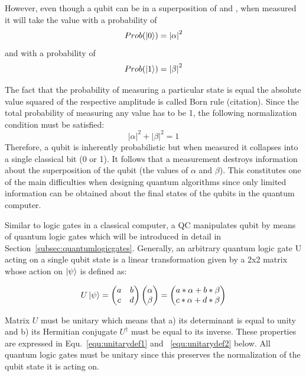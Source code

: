 However, even though a qubit can be in a superposition of \0 and \1, when measured it will take the value \0 with a probability of
\begin{equation}
\label{equ:bornrule0}
Prob(\ket{0}) = {|\alpha|}^{2}
\end{equation}
and \1 with a probability of 
\begin{equation}
\label{equ:bornrule1}
Prob(\ket{1}) = {|\beta|}^{2}
\end{equation}

The fact that the probability of measuring a particular state is equal the absolute value squared of the respective amplitude is called Born rule (citation). Since the total probability of measuring any value has to be 1, the following normalization condition must be satisfied:
\begin{equation}
\label{equ: normalization}
{|\alpha|}^{2} + {|\beta|}^{2} =  1
\end{equation}
Therefore, a qubit is inherently probabilistic but when measured it collapses into a single classical bit (0 or 1). It follows that a measurement destroys information about the superposition of the qubit (the values of $\alpha$ and $\beta$). This constitutes one of the main difficulties when designing quantum algorithms since only limited information can be obtained about the final states of the qubits in the quantum computer.

Similar to logic gates in a classical computer, a QC manipulates qubit by means of quantum logic gates which will be introduced in detail in Section~\ref{subsec:quantumlogicgates}. Generally, an arbitrary quantum logic gate U acting on a single qubit state is a linear transformation given by a 2x2 matrix whose action on $\ket{\psi}$ is defined as:

\begin{equation}
\label{equ:unitarytransformation}
U \ket{\psi} = \begin{pmatrix}
 a & b \\ 
 c & d
 \end{pmatrix} \begin{pmatrix}\alpha\\\beta\end{pmatrix} = \begin{pmatrix}a*\alpha+b*\beta\\c*\alpha+d*\beta\end{pmatrix}
\end{equation}

Matrix $U$ must be unitary which means that a) its determinant is equal to unity and b) its Hermitian conjugate $U^\dagger$ must be equal to its inverse. These properties are expressed in Equ.~\ref{equ:unitarydef1} and ~\ref{equ:unitarydef2} below. All quantum logic gates must be unitary since this preserves the normalization of the qubit state it is acting on.

